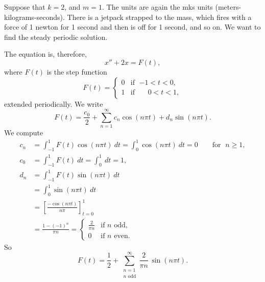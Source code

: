 \documentclass[12pt]{book}
\begin{document}
\begin{example} \label{afs:steadyex}
Suppose that $k=2$, and $m=1$.
The units are again the mks units
(meters-kilograms-seconds).
There is a jetpack strapped to the mass, which fires with a force of 1
newton for 1
second and then is off for 1 second, and so on.  We want to find the steady periodic
solution.

The equation is, therefore,
\begin{equation*}
x'' + 2 x = F(t) ,
\end{equation*}
where $F(t)$ is the step function
\begin{equation*}
F(t) =
\begin{cases}
0 & \text{if } \; {-1} < t < 0 , \\
1 & \text{if } \; \phantom{-}0 < t < 1 ,
\end{cases}
\end{equation*}
extended periodically.
We write
\begin{equation*}
F(t) = \frac{c_0}{2} + \sum_{n=1}^\infty
c_n \cos (n \pi t) +
d_n \sin (n \pi t) .
\end{equation*}
We compute
\begin{align*}
c_n & = \int_{-1}^1 F(t) \cos (n \pi t) ~ dt = 
\int_{0}^1 \cos (n \pi t) ~ dt = 0 \qquad \text{for } \; n \geq 1,
\\
c_0 & = \int_{-1}^1 F(t) ~ dt = 
\int_{0}^1 ~ dt = 1 ,
\\
d_n & = \int_{-1}^1 F(t) \sin (n \pi t) ~ dt
\\
& = \int_{0}^1 \sin (n \pi t) ~ dt
\\
& = \left[ \frac{-\cos (n \pi t)}{n \pi} \right]_{t=0}^1
\\
& = \frac{1-{(-1)}^n}{\pi n} =
\begin{cases}
\frac{2}{\pi n} & \text{if } n \text{ odd} , \\
0 & \text{if } n \text{ even} .
\end{cases}
\end{align*}
So
\begin{equation*}
F(t) = \frac{1}{2} + \sum_{\substack{n=1 \\ n \text{ odd}}}^\infty
\frac{2}{\pi n} \, \sin (n \pi t) .
\end{equation*}


\end{example}
\end{document}
